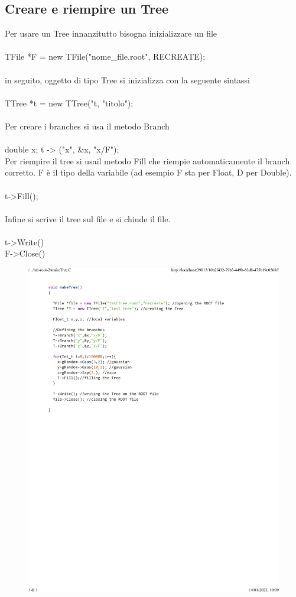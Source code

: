 \documentclass[10pt,a4paper]{article}
\begin{document}
\subsection{Creare e riempire un Tree}
Per usare un Tree innanzitutto bisogna inizializzare un file\\\\
TFile *F = new TFile("nome\_file.root", RECREATE);\\\\
 in seguito, oggetto di tipo Tree si inizializza con la seguente sintassi \\\\
TTree *t = new TTree("t, "titolo");\\\\
Per creare i branches si usa il metodo Branch\\\\
double x;
t -> ("x", \&x, "x/F");\\
Per riempire il tree si usail metodo Fill che riempie automaticamente il branch corretto. F è il tipo della variabile (ad esempio F sta per Float, D per Double). \\\\
t->Fill();\\\\
Infine si scrive il tree sul file e si chiude il file.\\\\
t->Write()\\
F->Close()\\
\newpage
\begin{figure}[h!]
	\centering
	\includegraphics[width=1.\linewidth]{_..._lab-root-2_makeTree.C}
	\caption{}
	\label{fig:1}
\end{figure}
\newpage
\end{document}
